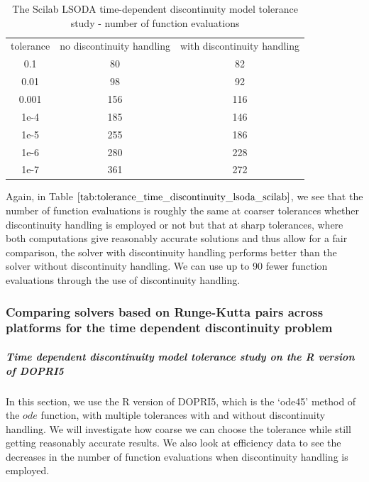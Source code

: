 \begin{table}[H]
\caption {The Scilab LSODA time-dependent discontinuity model tolerance study - number of function evaluations} 
\label{tab:tolerance_time_discontinuity_lsoda_scilab} 
\begin{center}
\begin{tabular}{ c c c }
tolerance & no discontinuity handling & with discontinuity handling \\ 
0.1 & 80 & 82 \\
0.01 & 98 & 92 \\
0.001 & 156 & 116 \\
1e-4 & 185 & 146 \\
1e-5 & 255 & 186 \\
1e-6 & 280 & 228 \\
1e-7 & 361 & 272 \\
\end{tabular}
\end{center}
\end{table}
Again, in Table $\ref{tab:tolerance_time_discontinuity_lsoda_scilab}$, we see that the number of function evaluations is roughly the same at coarser tolerances whether discontinuity handling is employed or not but that at sharp tolerances, where both computations give reasonably accurate solutions and thus allow for a fair comparison, the solver with discontinuity handling performs better than the solver without discontinuity handling. We can use up to 90 fewer function evaluations through the use of discontinuity handling. 

\subsubsection{Comparing solvers based on Runge-Kutta pairs across platforms for the time dependent discontinuity problem}
\subparagraph{Time dependent discontinuity model tolerance study on the R version of DOPRI5}
In this section, we use the R version of DOPRI5, which is the `ode45' method of the $ode$ function, with multiple tolerances with and without discontinuity handling. We will investigate how coarse we can choose the tolerance while still getting reasonably accurate results. We also look at efficiency data to see the decreases in the number of function evaluations when discontinuity handling is employed.

